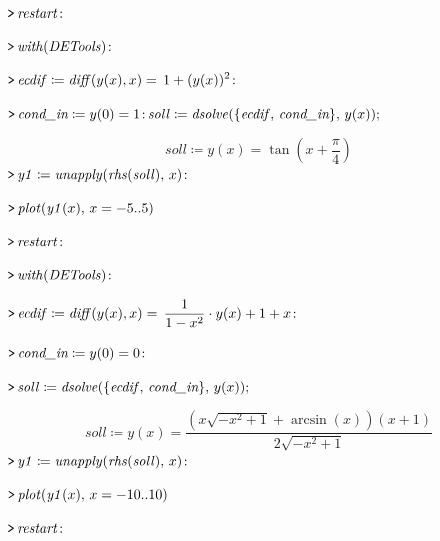 \documentclass{article}
\begin{document}
{}
\mapleinput
{$ \displaystyle \texttt{>\,} \mathit{restart} \colon  $}

\mapleinput
{$ \displaystyle \texttt{>\,} \mathit{with} (\mathit{DETools})\colon  $}

\mapleinput
{$ \displaystyle \texttt{>\,} \mathit{ecdif} \coloneqq \mathit{diff} (y (x),x)=\,1+(y (x))^{2}\colon  $}

\mapleinput
{$ \displaystyle \texttt{>\,} \textit{cond\_in} \coloneqq y (0)=1\colon 
\\
 \,\mathit{soll} \coloneqq \mathit{dsolve} (\{\mathit{ecdif} ,\,\textit{cond\_in} \},\,y (x)); $}

\begin{dmath}\label{(20)}
\mathit{soll} \coloneqq y \! \left(x \right)=\tan \! \left(x +\frac{\pi}{4}\right)
\end{dmath}
\mapleinput
{$ \displaystyle \texttt{>\,} \mathit{y1} \coloneqq \mathit{unapply} (\mathit{rhs} (\mathit{soll}),\,x)\colon  $}

\mapleinput
{$ \displaystyle \texttt{>\,} \mathit{plot} (\mathit{y1} (x),\,x =-5..5) $}

{}
\mapleinput
{$ \displaystyle \texttt{>\,} \mathit{restart} \colon  $}

\mapleinput
{$ \displaystyle \texttt{>\,} \mathit{with} (\mathit{DETools})\colon  $}

\mapleinput
{$ \displaystyle \texttt{>\,} \mathit{ecdif} \coloneqq \mathit{diff} (y (x),x)=\,\frac{1}{1-x^{2}}\cdot y (x)+1+x \colon  $}

\mapleinput
{$ \displaystyle \texttt{>\,} \textit{cond\_in} \coloneqq y (0)=0\colon  $}

\mapleinput
{$ \displaystyle \texttt{>\,} \mathit{soll} \coloneqq \mathit{dsolve} (\{\mathit{ecdif} ,\,\textit{cond\_in} \},\,y (x)); $}

\begin{dmath}\label{(21)}
\mathit{soll} \coloneqq y \! \left(x \right)=\frac{\left(x \sqrt{-x^{2}+1}+\arcsin \! \left(x \right)\right) \left(x +1\right)}{2 \sqrt{-x^{2}+1}}
\end{dmath}
\mapleinput
{$ \displaystyle \texttt{>\,} \mathit{y1} \coloneqq \mathit{unapply} (\mathit{rhs} (\mathit{soll}),\,x)\colon  $}

\mapleinput
{$ \displaystyle \texttt{>\,} \mathit{plot} (\mathit{y1} (x),\,x =-10..10) $}

{}
\mapleinput
{$ \displaystyle \texttt{>\,} \mathit{restart} \colon  $}
\end{document}
